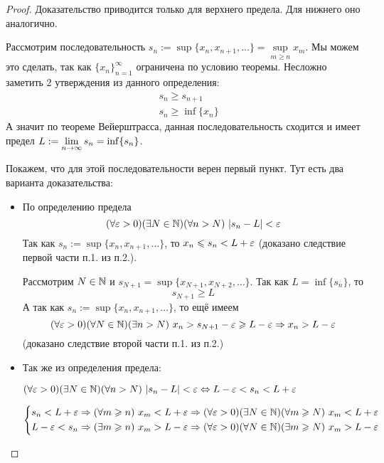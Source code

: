 \begin{proof}
	Доказательство приводится только для верхнего предела.
	Для нижнего оно аналогично.
	
	Рассмотрим последовательность $s_n := \sup \{x_n, x_{n + 1},
	\dots\} = \sup\limits_{m \ge n} x_m$. Мы можем это сделать,
	так как $\{x_n\}_{n = 1}^\infty$ ограничена по условию
	теоремы. Несложно заметить 2 утверждения из данного
	определения:
	\begin{align*}
		&s_n \ge s_{n + 1}
		\\
		&s_n \ge \inf \{x_n\}
	\end{align*}
	А значит по теореме Вейерштрасса, данная последовательность
	сходится и имеет предел $L := \lim\limits_{n \to \infty} s_n = \inf
	\{s_n\}$. 
	
	Покажем, что для этой последовательности верен первый пункт.
	Тут есть два варианта доказательства:
	\begin{itemize}
		\item 
			По определению предела 
			\[
				(\forall \varepsilon > 0)(\exists N \in \mathbb{N})(\forall n > N)
				\ |s_n - L| < \varepsilon
			\]
			Так как $s_n := \sup \{x_n, x_{n + 1}, \dots\}$, то
			$x_n \leqslant s_n < L + \varepsilon$ (доказано следствие первой части
			п.1. из п.2.).
			
			Рассмотрим $N \in \mathbb{N}$ и $s_{N + 1} = \sup \{x_{N + 1},
			x_{N + 2}, \dots\}$. Так как $L = \inf \{s_n\}$, то 
			\[
				s_{N + 1} \ge L
			\]
			А так как $s_n := \sup \{x_n, x_{n + 1}, \dots\}$,
			то ещё имеем
			\[
				(\forall \varepsilon > 0)(\forall N \in \mathbb{N})(\exists n > N)
				\ x_n > s_{N + 1} - \varepsilon \geqslant L - \varepsilon \Rightarrow x_n > L -\varepsilon
			\]
			(доказано следствие второй части п.1. из п.2.)
		\item
			Так же из определения предела:

			$(\forall \varepsilon > 0)(\exists N \in \mathbb{N})
			(\forall n > N)\ |s_n - L| < \varepsilon \Leftrightarrow L - \varepsilon <
			s_n < L + \varepsilon$
			
			$\left\{\begin{aligned}
				s_n < L + \varepsilon \Rightarrow (\forall m \geqslant n)\ x_m <
				L + \varepsilon \Rightarrow (\forall \varepsilon > 0)(\exists N \in \mathbb{N})
				(\forall m \geqslant N)\ x_m < L + \varepsilon
				\\
				L - \varepsilon < s_n \Rightarrow (\exists m \geqslant n)\ x_m >
				L - \varepsilon \Rightarrow (\forall \varepsilon > 0)(\forall N \in \mathbb{N})
				(\exists m \geqslant N)\ x_m > L - \varepsilon
			\end{aligned}\right.$
	\end{itemize}
	

\end{proof}
